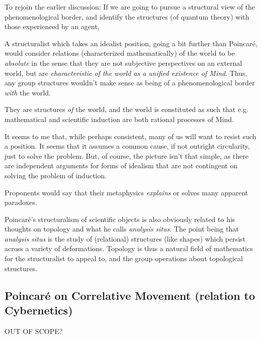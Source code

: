 To rejoin the earlier discussion: If we are going to pursue a structural view of the phenomenological border, and identify the structures (of quantum theory) with those experienced by an agent, 

A structuralist which takes an idealist position, going a bit further than Poincar\'e, would consider relations (characterized mathematically) of the world to be \emph{absolute} in the sense that they are not subjective perspectives on an external world, but are \emph{characteristic of the world as a unified existence of Mind}.  Thus, any group structures wouldn't make sense as being of a phenomenological border \emph{with} the world.  

They are structures \emph{of} the world, and the world is constituted as such that e.g. mathematical and scientific induction are both rational processes of Mind.  

It seems to me that, while perhaps consistent, many of us will want to resist such a position.  It seems that it assumes a common cause, if not outright circularity, just to solve the problem.  But, of course, the picture isn't that simple, as there are independent arguments for forms of idealism that are not contingent on solving the problem of induction.

Proponents would say that their metaphysics \emph{explains} or solves many apparent paradoxes.

Poincar\'e's structuralism of scientific objects is also obviously related to his thoughts on topology and what he calls \emph{analysis situs}.  The point being that \emph{analysis situs} is the study of (relational) structures (like shapes) which persist across a variety of deformations.  Topology is thus a natural field of mathematics for the structuralist to appeal to, and the group operations about topological structures.

\subsection{Poincar\'e on Correlative Movement (relation to Cybernetics)}

OUT OF SCOPE?

